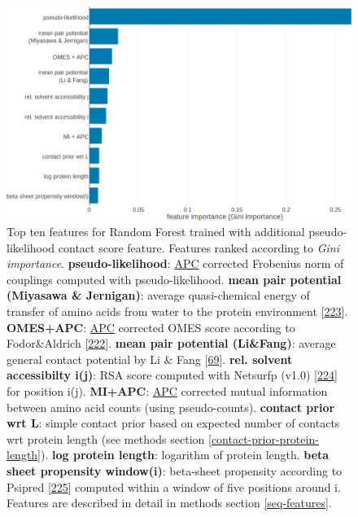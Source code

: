 \documentclass[11pt,a4paper,twoside]{book}
\theoremstyle{definition}
\theoremstyle{definition}
\theoremstyle{remark}
\begin{document}
\begin{figure}

{\centering \includegraphics[width=1\linewidth]{img/random_forest_contact_prior/additional_contat_score_features/feature_random_forest_top_pLLfeature} 

}

\caption{Top ten features for
Random Forest trained with additional pseudo-likelihood contact score
feature. Features ranked according to \emph{Gini importance}.
\textbf{pseudo-likelihood}: \protect\hyperlink{abbrev}{APC} corrected
Frobenius norm of couplings computed with pseudo-likelihood.
\textbf{mean pair potential (Miyasawa \& Jernigan)}: average
quasi-chemical energy of transfer of amino acids from water to the
protein environment {[}\protect\hyperlink{ref-Miyazawa1999a}{223}{]}.
\textbf{OMES+APC}: \protect\hyperlink{abbrev}{APC} corrected OMES score
according to Fodor\&Aldrich
{[}\protect\hyperlink{ref-Fodor2004a}{222}{]}. \textbf{mean pair
potential (Li\&Fang)}: average general contact potential by Li \& Fang
{[}\protect\hyperlink{ref-Li2011}{69}{]}. \textbf{rel. solvent
accessibilty i(j)}: RSA score computed with Netsurfp (v1.0)
{[}\protect\hyperlink{ref-Petersen2009a}{224}{]} for position i(j).
\textbf{MI+APC}: \protect\hyperlink{abbrev}{APC} corrected mutual
information between amino acid counts (using pseudo-counts).
\textbf{contact prior wrt L}: simple contact prior based on expected
number of contacts wrt protein length (see methods section
\ref{contact-prior-protein-length}). \textbf{log protein length}:
logarithm of protein length. \textbf{beta sheet propensity window(i)}:
beta-sheet propensity according to Psipred
{[}\protect\hyperlink{ref-Jones1999}{225}{]} computed within a window of
five positions around i. Features are described in detail in methods
section \ref{seq-features}.}\label{fig:feature-importance-rf-with-pll-score}
\end{figure}
\end{document}
